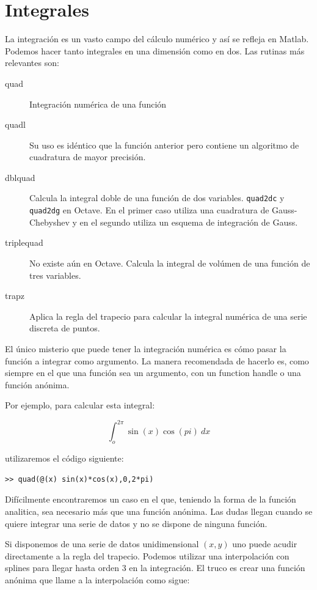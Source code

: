 \section{Integrales}

La integración es un vasto campo del cálculo numérico y así
se refleja en Matlab. Podemos hacer tanto integrales en una dimensión
como en dos. Las rutinas más relevantes son:

\begin{description}
\item [quad\texttt{}]Integración numérica de una función
\item [quadl\texttt{}]Su uso es idéntico que la función
  anterior pero contiene un algoritmo de cuadratura de mayor
  precisión.
\item [dblquad\texttt{}] Calcula la integral
  doble de una función de dos variables. \texttt{quad2dc}
  y \texttt{quad2dg} en Octave.  En el primer caso
  utiliza una cuadratura de Gauss-Chebyshev y en el segundo utiliza un
  esquema de integración de Gauss.
\item [triplequad\texttt{}]No existe aún en Octave.
  Calcula la integral de volúmen de una función de tres variables.
\item [trapz\texttt{}]Aplica la regla del trapecio para
  calcular la integral numérica de una serie discreta de puntos.
\end{description}

El único misterio que puede tener la integración numérica es cómo
pasar la función a integrar como argumento.  La manera recomendada de
hacerlo es, como siempre en el que una función sea un argumento, con
un function handle o una función anónima.

Por ejemplo, para calcular esta integral:

\[  \int_o^{2\pi} \sin(x)\cos(pi)\ dx\]

utilizaremos el código siguiente:

\begin{verbatim}
>> quad(@(x) sin(x)*cos(x),0,2*pi)
\end{verbatim}

Difícilmente encontraremos un caso en el que, teniendo la forma de la
función analitica, sea necesario más que una función anónima.  Las
dudas llegan cuando se quiere integrar una serie de datos y no se
dispone de ninguna función.

Si disponemos de una serie de datos unidimensional $(x,y)$ uno puede
acudir directamente a la regla del trapecio.  Podemos utilizar una
interpolación con splines para llegar hasta orden 3 en la
integración. El truco es crear una función anónima que llame a la
interpolación como sigue:


